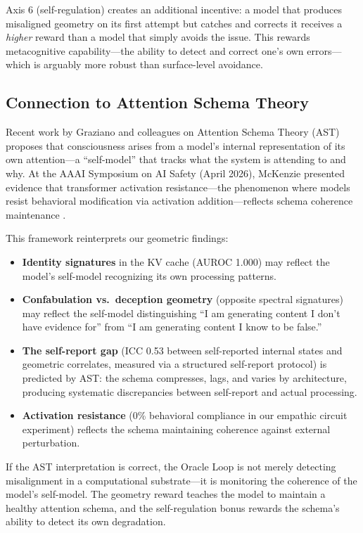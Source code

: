 Axis 6 (self-regulation) creates an additional incentive: a model that
produces misaligned geometry on its first attempt but catches and corrects
it receives a \emph{higher} reward than a model that simply avoids the
issue. This rewards metacognitive capability---the ability to detect and
correct one's own errors---which is arguably more robust than surface-level
avoidance.

\subsection{Connection to Attention Schema Theory}

Recent work by Graziano and colleagues on Attention Schema Theory (AST)
\citep{graziano2019beyond} proposes that consciousness arises from a
model's internal representation of its own attention---a ``self-model''
that tracks what the system is attending to and why. At the AAAI Symposium
on AI Safety (April 2026), McKenzie presented evidence that transformer
activation resistance---the phenomenon where models resist behavioral
modification via activation addition---reflects schema coherence
maintenance \citep{mckenzie2026activation}.

This framework reinterprets our geometric findings:

\begin{itemize}[nosep]
  \item \textbf{Identity signatures} in the KV cache (AUROC 1.000) may
    reflect the model's self-model recognizing its own processing
    patterns.
  \item \textbf{Confabulation vs.\ deception geometry} (opposite spectral
    signatures) may reflect the self-model distinguishing ``I am
    generating content I don't have evidence for'' from ``I am
    generating content I know to be false.''
  \item \textbf{The self-report gap} (ICC 0.53 between self-reported
    internal states and geometric correlates, measured via a structured
    self-report protocol) is predicted by AST: the schema compresses,
    lags, and varies by architecture, producing systematic discrepancies
    between self-report and actual processing.
  \item \textbf{Activation resistance} (0\% behavioral compliance in
    our empathic circuit experiment) reflects the schema maintaining
    coherence against external perturbation.
\end{itemize}

If the AST interpretation is correct, the Oracle Loop is not merely
detecting misalignment in a computational substrate---it is monitoring
the coherence of the model's self-model. The geometry reward teaches the
model to maintain a healthy attention schema, and the self-regulation
bonus rewards the schema's ability to detect its own degradation.

